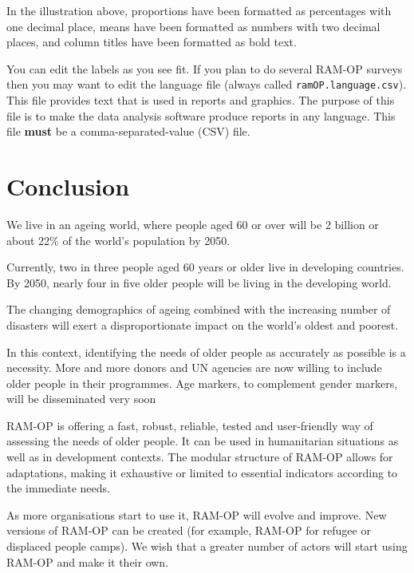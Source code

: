 \documentclass[12pt,a4paper]{book}
\theoremstyle{definition}
\theoremstyle{definition}
\theoremstyle{definition}
\theoremstyle{remark}
\begin{document}
In the illustration above, proportions have been formatted as
percentages with one decimal place, means have been formatted as numbers
with two decimal places, and column titles have been formatted as bold
text.

You can edit the labels as you see fit. If you plan to do several RAM-OP
surveys then you may want to edit the language file (always called
\texttt{ramOP.language.csv}). This file provides text that is used in
reports and graphics. The purpose of this file is to make the data
analysis software produce reports in any language. This file
\textbf{must} be a comma-separated-value (CSV) file.

\hypertarget{conclusion}{%
\chapter{Conclusion}\label{conclusion}}

We live in an ageing world, where people aged 60 or over will be 2
billion or about 22\% of the world's population by 2050.

Currently, two in three people aged 60 years or older live in developing
countries. By 2050, nearly four in five older people will be living in
the developing world.

The changing demographics of ageing combined with the increasing number
of disasters will exert a disproportionate impact on the world's oldest
and poorest.

In this context, identifying the needs of older people as accurately as
possible is a necessity. More and more donors and UN agencies are now
willing to include older people in their programmes. Age markers, to
complement gender markers, will be disseminated very soon

RAM-OP is offering a fast, robust, reliable, tested and user-friendly
way of assessing the needs of older people. It can be used in
humanitarian situations as well as in development contexts. The modular
structure of RAM-OP allows for adaptations, making it exhaustive or
limited to essential indicators according to the immediate needs.

As more organisations start to use it, RAM-OP will evolve and improve.
New versions of RAM-OP can be created (for example, RAM-OP for refugee
or displaced people camps). We wish that a greater number of actors will
start using RAM-OP and make it their own.


\end{document}
